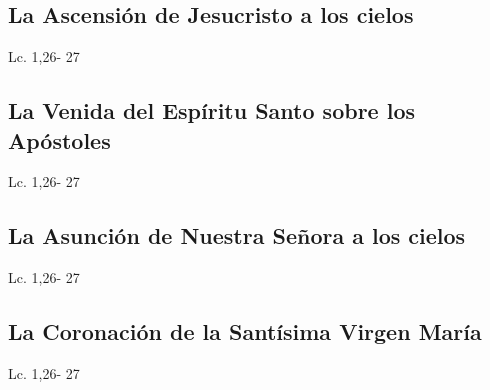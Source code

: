 \documentclass[a4paper,11pt,sans]{article}
\begin{document}
    \subsection*{\hfil La Ascensión de Jesucristo a los cielos \hfil}
      \begin{multicols}{2}

      \columnbreak
                           
      \end{multicols}         
      \begin{center}
        Lc. 1,26- 27           
      \end{center}
    \subsection*{\hfil La Venida del Espíritu Santo sobre los Apóstoles \hfil}
      \begin{multicols}{2}

      \columnbreak
                           
      \end{multicols}         
      \begin{center}
        Lc. 1,26- 27           
      \end{center}
    \subsection*{\hfil La Asunción de Nuestra Señora a los cielos \hfil}
      \begin{multicols}{2}

      \columnbreak
                           
      \end{multicols}         
      \begin{center}
        Lc. 1,26- 27           
      \end{center}
    \subsection*{\hfil La Coronación de la Santísima Virgen María \hfil}
      \begin{multicols}{2}

      \columnbreak
                           
      \end{multicols}         
      \begin{center}
        Lc. 1,26- 27           
      \end{center}
\end{document}
